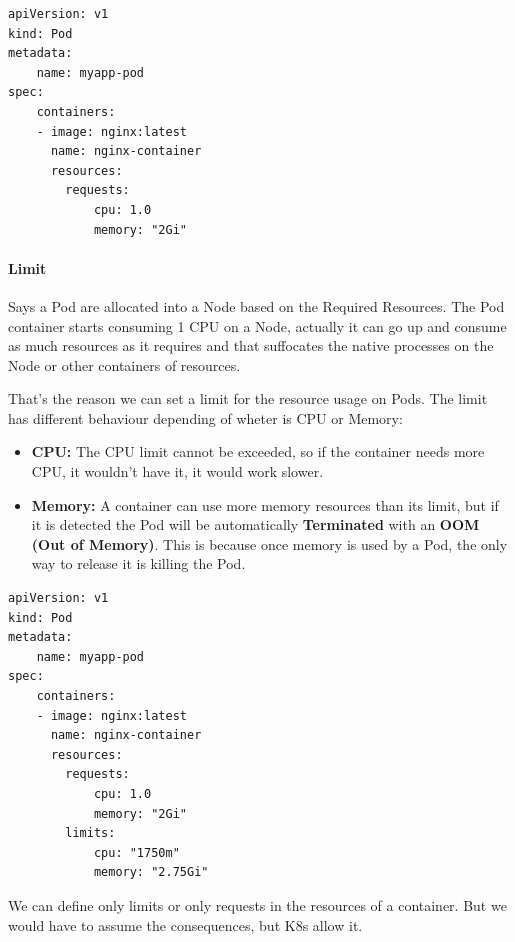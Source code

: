 \documentclass{article}
\newenvironment{blocktemplateII}[1]{%
    \tcolorbox[beamer,%
    noparskip,breakable,
    colframe=Green,%
    colbacklower=LimeGreen!75!LightGreen,%
    title=#1]}%
    {\endtcolorbox}
\newenvironment{codetemplate}[1][]{%
  \mybasecolorbox[#1]
  \itshape
}{%
  \endmybasecolorbox
}
\begin{document}
\begin{codetemplate}{}
\begin{verbatim}
apiVersion: v1
kind: Pod
metadata:
    name: myapp-pod
spec:
    containers:
    - image: nginx:latest
      name: nginx-container
      resources:
        requests:
            cpu: 1.0
            memory: "2Gi"
\end{verbatim}
\end{codetemplate}

\paragraph{Limit}

Says a Pod are allocated into a Node based on the Required Resources. The Pod container starts consuming 1 CPU on a Node, actually it can go up and consume as much resources as it requires and that suffocates the native processes on the Node or other containers of resources.

That's the reason we can set a limit for the resource usage on Pods. The limit has different behaviour depending of wheter is CPU or Memory:
\begin{itemize}
    \item \textbf{CPU:} The CPU limit cannot be exceeded, so if the container needs more CPU, it wouldn't have it, it would work slower.
    \item \textbf{Memory:} A container can use more memory resources than its limit, but if it is detected the Pod will be automatically \textbf{Terminated} with an \textbf{OOM (Out of Memory)}. This is because once memory is used by a Pod, the only way to release it is killing the Pod.
\end{itemize}

\begin{codetemplate}{}
\begin{verbatim}
apiVersion: v1
kind: Pod
metadata:
    name: myapp-pod
spec:
    containers:
    - image: nginx:latest
      name: nginx-container
      resources:
        requests:
            cpu: 1.0
            memory: "2Gi"
        limits:
            cpu: "1750m"
            memory: "2.75Gi"
\end{verbatim}
\end{codetemplate}

\begin{blocktemplateII}{NOTE}
We can define only limits or only requests in the resources of a container. But we would have to assume the consequences, but K8s allow it.
\end{blocktemplateII}
\end{document}
